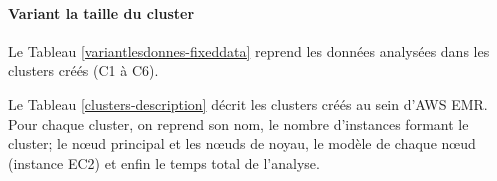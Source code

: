 \begin{figure}[H]
	\centering
	\captionsetup{justification=centering}
	\resizebox{\textwidth}{!}{
		
	}
	\caption{ }
	\label{fig:sparktimingEMR}
\end{figure}


\paragraph{Variant la taille du cluster}

Le Tableau 	\ref{variantlesdonnes-fixeddata} reprend les données analysées dans les clusters créés (C1 à C6).

\begin{table}[H]
	\centering
	\caption{Les données analysées dans les clusters C1 à C6 }
	\label{variantlesdonnes-fixeddata}
\end{table}

Le Tableau \ref{clusters-description} décrit les clusters créés au sein d'AWS EMR. Pour chaque cluster, on reprend son nom, le nombre d'instances formant le cluster; le n\oe{}ud principal et  les n\oe{}uds de noyau, le modèle de chaque n\oe{}ud (instance EC2) et enfin le temps total de l'analyse. 

\begin{table}[H]
	\centering
\caption{Description des clusters utilisés avec le temps total d'exécution sur les données A}
\label{clusters-description}
\end{table}


